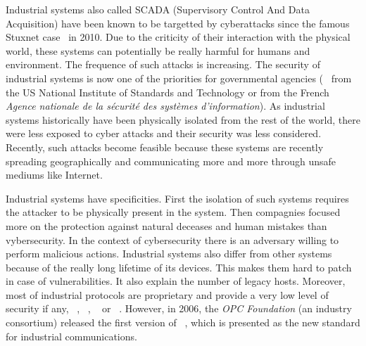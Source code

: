 
Industrial systems also called SCADA (Supervisory Control And Data
Acquisition) have been known to be targetted by cyberattacks since the
famous Stuxnet case~\cite{Lan11} in 2010.  Due to the criticity of
their interaction with the physical world, these systems can
potentially be really harmful for humans and environment.  The
frequence of such attacks is increasing.  The security of industrial
systems is now one of the priorities for governmental agencies
(\eg~\cite{SFS11} from the US National Institute of Standards and
Technology or
\cite{ANSSI12_guide_securite_industrielle_en} from the French {\em Agence
nationale de la sécurité des systèmes d'information}).  As industrial
systems historically have been physically isolated from the rest of
the world, there were less exposed to cyber attacks and their security
was less considered. Recently, such attacks become feasible because
these systems are recently spreading geographically and communicating
more and more through unsafe mediums like Internet.


Industrial systems have specificities. First the isolation of such
systems requires the attacker to be physically present in the
system. Then compagnies focused more on the protection against natural
deceases and human mistakes than vybersecurity. In the context of
cybersecurity there is an adversary willing to perform malicious
actions.  Industrial systems also differ from other systems because of
the really long lifetime of its devices.  This makes them hard to
patch in case of vulnerabilities. It also explain the number of legacy
hosts. Moreover, most of industrial protocols are proprietary and
provide a very low level of security if
any, \eg \modbus~\cite{MODBUS}, \profinet~\cite{PROFINET}, \etherip~\cite{Bro01}
or
\dnp~\cite{CR04}.
However, in 2006, the {\em OPC Foundation} (an industry consortium)
released the first version of \opcua~\cite{MLD09}, which is presented
as the new standard for industrial communications. %

